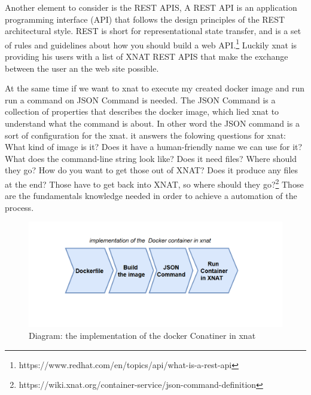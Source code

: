 Another element to consider is the REST APIS, A REST API is an application programming interface (API) that follows the design principles of the REST architectural style. REST is short for representational state transfer, and is a set of rules and guidelines about how you should build a web API.\footnote{https://www.redhat.com/en/topics/api/what-is-a-rest-api} Luckily xnat is providing his users with a list of XNAT REST APIS that make the exchange between the user an the web site possible. 

At the same time if we want to xnat to execute my created docker image and run run a command on  JSON Command is needed. The JSON  Command is a collection of properties that describes the docker image, which lied xnat to understand what the command  is about. In other word the JSON command is a sort of configuration for the xnat. it answers the folowing  questions for xnat: What kind of image is it? Does it have a human-friendly name we can use for it? What does the command-line string look like? Does it need files? Where should they go? How do you want to get those out of XNAT? Does it produce any files at the end? Those have to get back into XNAT, so where should they go?\footnote{https://wiki.xnat.org/container-service/json-command-definition} Those are the fundamentals knowledge needed in order to achieve a automation of the process. 




\begin{figure}
    \centering
    \includegraphics[width=0.9\linewidth]{en/content/ste.png}
    \caption{Diagram: the implementation of the docker Conatiner in xnat}
    \label{fig:enter-label}
\end{figure}





